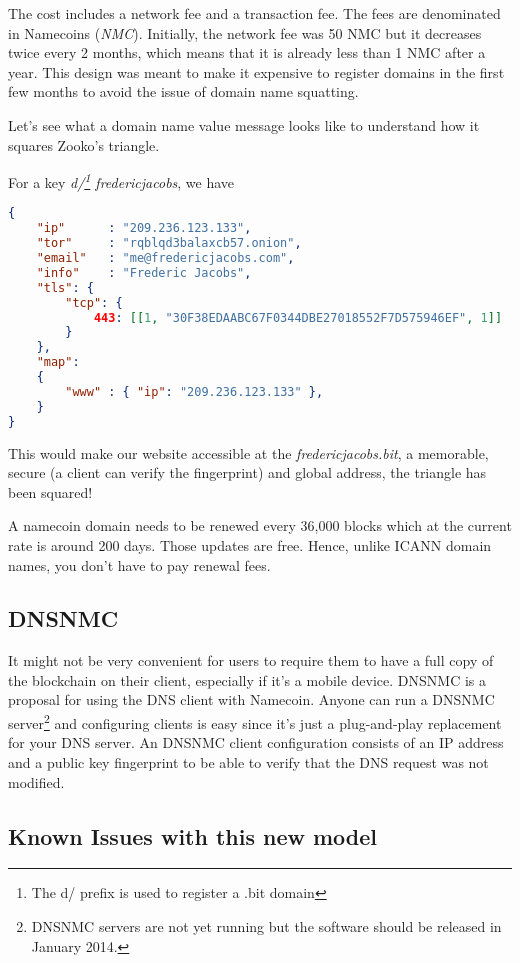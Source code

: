 \documentclass{vldb}
\begin{document}
The cost includes a network fee and a transaction fee. The fees are denominated in Namecoins (\emph{NMC}). Initially, the network fee was 50 NMC but it decreases twice every 2 months, which means that it is already less than 1 NMC after a year. This design was meant to make it expensive to register domains in the first few months to avoid the issue of domain name squatting.

Let's see what a domain name value message looks like to understand how it squares Zooko's triangle.

For a key \emph{d/\footnote{The d/ prefix is used to register a .bit domain} fredericjacobs}, we have 

\begin{lstlisting}[language=json,firstnumber=1]
{
    "ip"      : "209.236.123.133",
    "tor"     : "rqblqd3balaxcb57.onion",
    "email"   : "me@fredericjacobs.com",
    "info"    : "Frederic Jacobs",
    "tls": {
        "tcp": {
            443: [[1, "30F38EDAABC67F0344DBE27018552F7D575946EF", 1]]
        }
    },
    "map":
    {
        "www" : { "ip": "209.236.123.133" },
    }
}
\end{lstlisting}

This would make our website accessible at the \emph{fredericjacobs.bit}, a memorable, secure (a client can verify the fingerprint) and global address, the triangle has been squared!

A namecoin domain needs to be renewed every 36,000 blocks which at the current rate is around 200 days. Those updates are free. Hence, unlike ICANN domain names, you don't have to pay renewal fees.

\subsection{DNSNMC}

It might not be very convenient for users to require them to have a full copy of the blockchain on their client, especially if it's a mobile device. DNSNMC\cite{okTurtles} is a proposal for using the DNS client with Namecoin. Anyone can run a DNSNMC server\footnote{DNSNMC servers are not yet running but the software should be released in January 2014.} and configuring clients is easy since it's just a plug-and-play replacement for your DNS server. An DNSNMC client configuration consists of an IP address and a public key fingerprint to be able to verify that the DNS request was not modified. 

\subsection{Known Issues with this new model}
\end{document}
